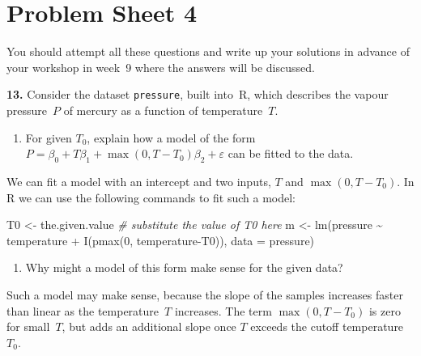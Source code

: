 \documentclass[
  a4paper,
]{article}
\newenvironment{Shaded}{\begin{snugshade}}{\end{snugshade}}
\newcommand{\AttributeTok}[1]{\textcolor[rgb]{0.77,0.63,0.00}{#1}}
\newcommand{\CommentTok}[1]{\textcolor[rgb]{0.56,0.35,0.01}{\textit{#1}}}
\newcommand{\DecValTok}[1]{\textcolor[rgb]{0.00,0.00,0.81}{#1}}
\newcommand{\FunctionTok}[1]{\textcolor[rgb]{0.00,0.00,0.00}{#1}}
\newcommand{\NormalTok}[1]{#1}
\newcommand{\OtherTok}[1]{\textcolor[rgb]{0.56,0.35,0.01}{#1}}
\newcommand{\SpecialCharTok}[1]{\textcolor[rgb]{0.00,0.00,0.00}{#1}}
\providecommand{\tightlist}{%
  \setlength{\itemsep}{0pt}\setlength{\parskip}{0pt}}
\theoremstyle{definition}
\theoremstyle{definition}
\theoremstyle{definition}
\theoremstyle{definition}
\theoremstyle{remark}
\begin{document}
\clearpage

\hypertarget{P04}{%
\section*{Problem Sheet 4}\label{P04}}

You should attempt all these questions and write up your solutions in advance
of your workshop in week~9 where the answers will be discussed.

\textbf{13.} Consider the dataset \texttt{pressure}, built into~R, which
describes the vapour pressure~\(P\) of mercury as a function of
temperature~\(T\).

\begin{enumerate}
\def\labelenumi{\alph{enumi}.}
\tightlist
\item
  For given \(T_0\), explain how a model of the form
  \(P = \beta_0 + T \beta_1 + \max(0, T-T_0) \beta_2 + \varepsilon\) can be
  fitted to the data.
\end{enumerate}

\begin{myanswers}

We can fit a model with an intercept and two inputs,
\(T\) and \(\max(0, T-T_0)\). In R we can use the following
commands to fit such a model:

\begin{Shaded}
\begin{Highlighting}[]
\NormalTok{T0 }\OtherTok{\textless{}{-}}\NormalTok{ the.given.value }\CommentTok{\# substitute the value of T0 here}
\NormalTok{m }\OtherTok{\textless{}{-}} \FunctionTok{lm}\NormalTok{(pressure }\SpecialCharTok{\textasciitilde{}}\NormalTok{ temperature }\SpecialCharTok{+} \FunctionTok{I}\NormalTok{(}\FunctionTok{pmax}\NormalTok{(}\DecValTok{0}\NormalTok{, temperature}\SpecialCharTok{{-}}\NormalTok{T0)),}
        \AttributeTok{data =}\NormalTok{ pressure)}
\end{Highlighting}
\end{Shaded}

\end{myanswers}

\begin{enumerate}
\def\labelenumi{\alph{enumi}.}
\setcounter{enumi}{1}
\tightlist
\item
  Why might a model of this form make sense for the given data?
\end{enumerate}

\begin{myanswers}
Such a model may make sense, because the slope of the
samples increases faster than linear as the temperature~\(T\)
increases. The term \(\max(0, T-T_0)\) is zero for small~\(T\),
but adds an additional slope once \(T\) exceeds the cutoff
temperature~\(T_0\).

\end{myanswers}
\end{document}
